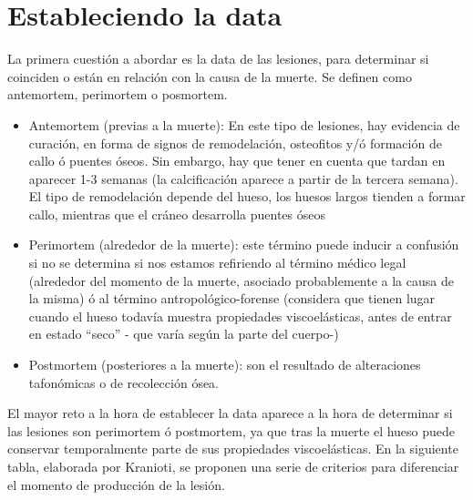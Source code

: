 \section{Estableciendo la data}
La primera cuestión a abordar es la data de las lesiones, para determinar si coinciden o están en relación con la causa de la muerte. Se definen como antemortem, perimortem o posmortem.\
\begin{itemize}
	\item Antemortem (previas a la muerte): En este tipo de lesiones, hay evidencia de curación, en forma de signos de remodelación, osteofitos y/ó formación de callo ó puentes óseos. Sin embargo, hay que tener en cuenta que tardan en aparecer 1-3 semanas (la calcificación aparece a partir de la tercera semana).  El tipo de remodelación depende del hueso, los huesos largos tienden a formar callo, mientras que el cráneo desarrolla puentes óseos \cite{Kranioti2015}
	\item Perimortem (alrededor de la muerte): este término puede inducir a confusión si no se determina si nos estamos refiriendo al término médico legal (alrededor del momento de la muerte, asociado probablemente a la causa de la misma) ó al término antropológico-forense (considera que tienen lugar cuando el hueso todavía muestra propiedades viscoelásticas, antes de entrar en estado “seco” - que varía según la parte del cuerpo-) \cite{Kranioti2015}
	\item Postmortem (posteriores a la muerte): son el resultado de alteraciones tafonómicas o de recolección ósea. 
\end{itemize}
El mayor reto a la hora de establecer la data aparece a la hora de determinar si las lesiones son perimortem ó postmortem, ya que tras la muerte el hueso puede conservar temporalmente parte de sus propiedades viscoelásticas. En la siguiente tabla, elaborada por Kranioti\cite{Kranioti2015}, se proponen una serie de criterios para diferenciar el momento de producción de la lesión.

